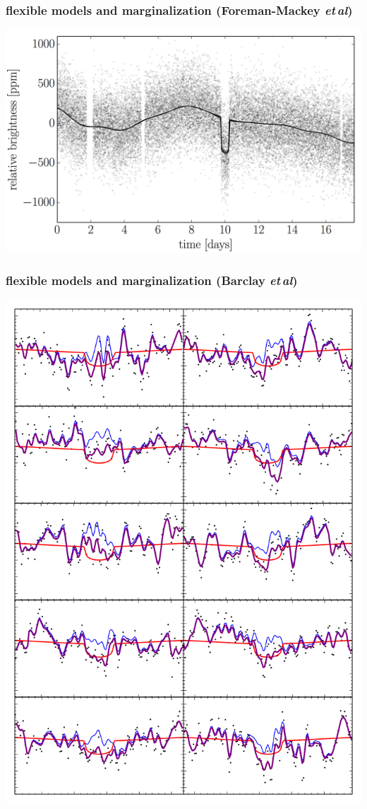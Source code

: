 \documentclass{beamer}
\newcommand{\foreign}[1]{\textsl{#1}}
\newcommand{\etal}{\foreign{et\,al}}
\begin{document}
\begin{frame}
  \frametitle{flexible models and marginalization \small{(Foreman-Mackey \etal)}}
  \includegraphics[width=\textwidth]{kepler-prediction.png}
\end{frame}

\begin{frame}
  \frametitle{flexible models and marginalization \small{(Barclay \etal)}}
  \includegraphics[height=0.9\textheight]{ten_transits.png}
\end{frame}
\end{document}
